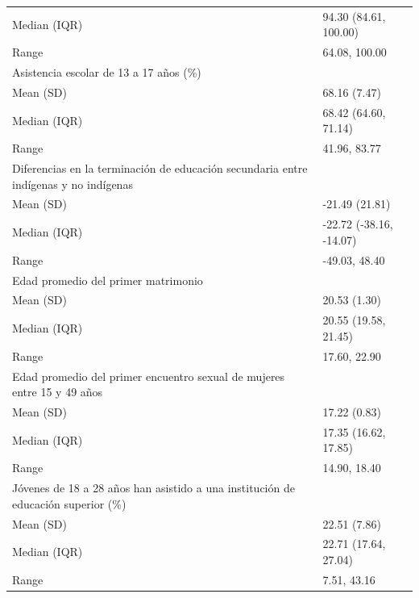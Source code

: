 \begin{table}
\begin{tabular}{ll}
\hspace{1em}Median (IQR) & 94.30 (84.61, 100.00)\\
\hspace{1em}Range & 64.08, 100.00\\
\addlinespace
Asistencia escolar de 13 a 17 años (\%) & \\
\hspace{1em}Mean (SD) & 68.16 (7.47)\\
\hspace{1em}Median (IQR) & 68.42 (64.60, 71.14)\\
\hspace{1em}Range & 41.96, 83.77\\
Diferencias en la terminación de educación secundaria entre indígenas y no indígenas & \\
\addlinespace
\hspace{1em}Mean (SD) & -21.49 (21.81)\\
\hspace{1em}Median (IQR) & -22.72 (-38.16, -14.07)\\
\hspace{1em}Range & -49.03, 48.40\\
Edad promedio del primer matrimonio & \\
\hspace{1em}Mean (SD) & 20.53 (1.30)\\
\addlinespace
\hspace{1em}Median (IQR) & 20.55 (19.58, 21.45)\\
\hspace{1em}Range & 17.60, 22.90\\
Edad promedio del primer encuentro sexual de mujeres entre 15 y 49 años & \\
\hspace{1em}Mean (SD) & 17.22 (0.83)\\
\hspace{1em}Median (IQR) & 17.35 (16.62, 17.85)\\
\addlinespace
\hspace{1em}Range & 14.90, 18.40\\
Jóvenes de 18 a 28 años han asistido a una institución de educación superior (\%) & \\
\hspace{1em}Mean (SD) & 22.51 (7.86)\\
\hspace{1em}Median (IQR) & 22.71 (17.64, 27.04)\\
\hspace{1em}Range & 7.51, 43.16\\

\end{tabular}
\end{table}
